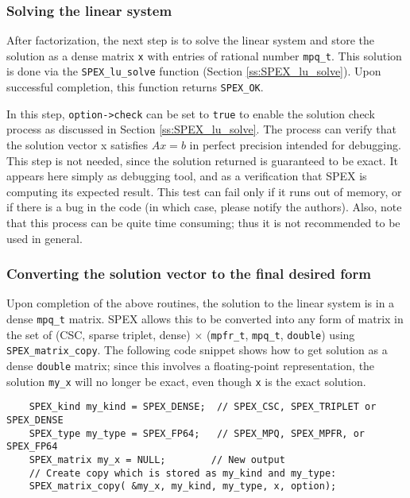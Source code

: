 \documentclass[12pt]{report}
\theoremstyle{definition}
\begin{document}
\subsubsection{Solving the linear system}

After factorization, the next step is to solve the linear system and store the
solution as a dense matrix \verb|x| with entries of rational number
\verb|mpq_t|. This solution is done via the \verb|SPEX_lu_solve|
function (Section \ref{ss:SPEX_lu_solve}).
Upon successful completion, this function returns \verb|SPEX_OK|.

In this step, \verb|option->check| can be set to \verb|true| to enable the
solution check process as discussed in Section \ref{ss:SPEX_lu_solve}.  The
process can verify that the solution vector x satisfies $Ax=b$ in perfect
precision intended for debugging.  This step is not needed, since the solution
returned is guaranteed to be exact.   It appears here simply as debugging tool,
and as a verification that SPEX is computing its expected result.  This test
can fail only if it runs out of memory, or if there is a bug in the code (in
which case, please notify the authors).  Also, note that this process can be
quite time consuming; thus it is not recommended to be used in general.

\subsubsection{Converting the solution vector to the final desired form}

Upon completion of the above routines, the solution to the linear system is in
a dense \verb|mpq_t| matrix. SPEX allows this to be converted into any form
of matrix in the set of (CSC, sparse triplet, dense) $\times$ (\verb|mpfr_t|,
\verb|mpq_t|, \verb|double|) using \verb|SPEX_matrix_copy|. The following code
snippet shows how to get solution as a dense \verb|double| matrix; since this
involves a floating-point representation, the solution \verb|my_x| will no
longer be exact, even though \verb|x| is the exact solution.

{\small
\begin{verbatim}
    SPEX_kind my_kind = SPEX_DENSE;  // SPEX_CSC, SPEX_TRIPLET or SPEX_DENSE
    SPEX_type my_type = SPEX_FP64;   // SPEX_MPQ, SPEX_MPFR, or SPEX_FP64
    SPEX_matrix my_x = NULL;        // New output
    // Create copy which is stored as my_kind and my_type:
    SPEX_matrix_copy( &my_x, my_kind, my_type, x, option);\end{verbatim} }
\end{document}
